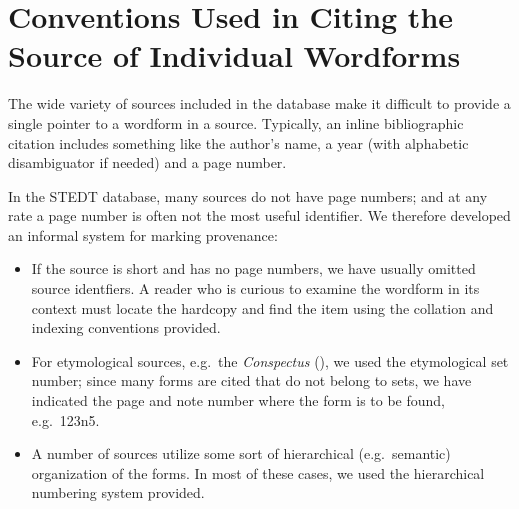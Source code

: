 \section*{Conventions Used in Citing the Source of Individual Wordforms}
\begin{multicols}{2}
The wide variety of sources included in the database make it difficult to provide a single pointer to a wordform in a source.
Typically, an inline bibliographic citation includes something like the author’s name, a year (with alphabetic disambiguator if needed)
and a page number.

In the STEDT database, many sources do not have page numbers; and at any rate a page number is often not the most useful identifier.
We therefore developed an informal system for marking provenance:

\begin{itemize}
\item If the source is short and has no page numbers, we have usually omitted source identfiers. A reader who is curious to examine 
the wordform in its context must locate the hardcopy and find the item using the collation and indexing conventions provided.
\item For etymological sources, e.g.\ the \textit{Conspectus} (\textit{}), we used the etymological set number;
since many forms are cited that do not belong to sets, we have indicated the page and note number where the form is to be found, e.g.~123n5.
\item A number of sources utilize some sort of hierarchical (e.g.\ semantic) organization of the forms. In most of these cases, we used the
hierarchical numbering system provided.
\end{itemize}

\end{multicols}


